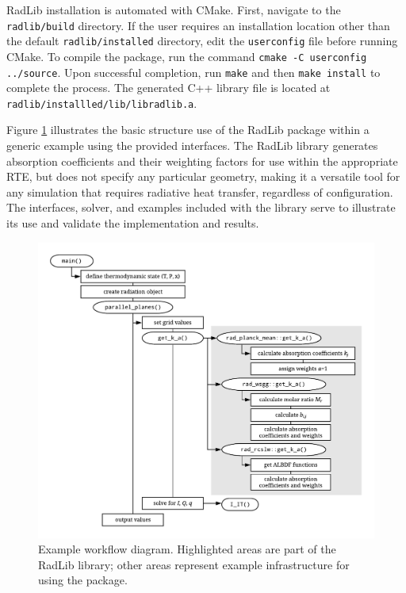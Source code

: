 \documentclass[preprint,12pt, a4paper]{elsarticle}
\begin{document}
RadLib installation is automated with CMake. First, navigate to the \texttt{radlib/build} directory. If the user requires an installation location other than the default \texttt{radlib/installed} directory, edit the \texttt{user\textunderscore config} file before running CMake. To compile the package, run the command \texttt{cmake -C user\textunderscore config ../source}. Upon successful completion, run \texttt{make} and then \texttt{make install} to complete the process. The generated C++ library file is located at \texttt{radlib/installled/lib/libradlib.a}. 

Figure \ref{fig:flowchart} illustrates the basic structure use of the RadLib package within a generic example using the provided interfaces. The RadLib library generates absorption coefficients and their weighting factors for use within the appropriate RTE, but does not specify any particular geometry, making it a versatile tool for any simulation that requires radiative heat transfer, regardless of configuration. The interfaces, solver, and examples included with the library serve to illustrate its use and validate the implementation and results. 
%
\begin{figure}
	\begin{center}
		\includegraphics[width=\textwidth]{../figures/radlib_structure.pdf}
	\end{center}
	\caption{Example workflow diagram. Highlighted areas are part of the RadLib library; other areas represent example infrastructure for using the package.}
\label{fig:flowchart}
\end{figure}
%
\end{document}
